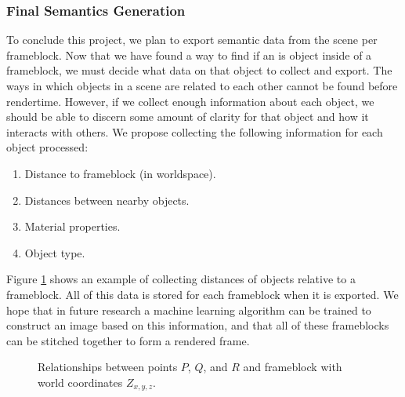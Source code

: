 \documentclass[conference]{IEEEtran}
\begin{document}
\subsubsection{Final Semantics Generation}
To conclude this project, we plan to export semantic data from the scene per frameblock.
Now that we have found a way to find if an is object inside of a frameblock,
we must decide what data on that object to collect and export.
The ways in which objects in a scene are related to each other cannot be found before rendertime.
However, if we collect enough information about each object, we should be able to discern some amount of clarity
for that object and how it interacts with others.
We propose collecting the following information for each object processed:
\bigskip
\begin{enumerate}
\item Distance to frameblock (in worldspace).
\item Distances between nearby objects.
\item Material properties.
\item Object type.
\end{enumerate}
\bigskip
Figure \ref{fig:distances} shows an example of collecting distances of objects relative to a frameblock.
All of this data is stored for each frameblock when it is exported.
We hope that in future research a machine learning algorithm can be trained to construct an image based on this information,
and that all of these frameblocks can be stitched together to form a rendered frame.

\begin{adjustwidth}{2.5em}{0pt}
\begin{figure}[h!]
\begin{center}
\end{center}
\caption{Relationships between points $P$, $Q$, and $R$ and frameblock with world coordinates $Z_{x,y,z}$.}
\label{fig:distances}
\end{figure}
\end{adjustwidth}
\end{document}
